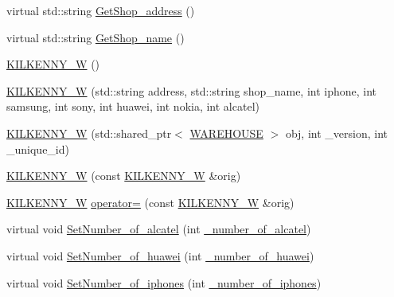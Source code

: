 \begin{DoxyCompactItemize}
\item 
virtual std\+::string \hyperlink{class_k_i_l_k_e_n_n_y___w_ad35a9d60fff2a3c1088f93ff04e6d9d4_ad35a9d60fff2a3c1088f93ff04e6d9d4}{Get\+Shop\+\_\+address} ()
\item 
virtual std\+::string \hyperlink{class_k_i_l_k_e_n_n_y___w_a93dac05f03edc97797f89501aa2af73a_a93dac05f03edc97797f89501aa2af73a}{Get\+Shop\+\_\+name} ()
\item 
\hyperlink{class_k_i_l_k_e_n_n_y___w_aee4c4b30bc934ff827f0851077b7fbab_aee4c4b30bc934ff827f0851077b7fbab}{K\+I\+L\+K\+E\+N\+N\+Y\+\_\+W} ()
\item 
\hyperlink{class_k_i_l_k_e_n_n_y___w_a292872c50225002759ebe70be3c96a72_a292872c50225002759ebe70be3c96a72}{K\+I\+L\+K\+E\+N\+N\+Y\+\_\+W} (std\+::string address, std\+::string shop\+\_\+name, int iphone, int samsung, int sony, int huawei, int nokia, int alcatel)
\item 
\hyperlink{class_k_i_l_k_e_n_n_y___w_a6df9a34ae732b0196391aceecf865089_a6df9a34ae732b0196391aceecf865089}{K\+I\+L\+K\+E\+N\+N\+Y\+\_\+W} (std\+::shared\+\_\+ptr$<$ \hyperlink{class_w_a_r_e_h_o_u_s_e}{W\+A\+R\+E\+H\+O\+U\+SE} $>$ obj, int \+\_\+version, int \+\_\+unique\+\_\+id)
\item 
\hyperlink{class_k_i_l_k_e_n_n_y___w_a370a1fb0d26d2b80da6e1101921d1564_a370a1fb0d26d2b80da6e1101921d1564}{K\+I\+L\+K\+E\+N\+N\+Y\+\_\+W} (const \hyperlink{class_k_i_l_k_e_n_n_y___w}{K\+I\+L\+K\+E\+N\+N\+Y\+\_\+W} \&orig)
\item 
\hyperlink{class_k_i_l_k_e_n_n_y___w}{K\+I\+L\+K\+E\+N\+N\+Y\+\_\+W} \hyperlink{class_k_i_l_k_e_n_n_y___w_acff3cfb6cc15b4c4bc0dbe5685406393_acff3cfb6cc15b4c4bc0dbe5685406393}{operator=} (const \hyperlink{class_k_i_l_k_e_n_n_y___w}{K\+I\+L\+K\+E\+N\+N\+Y\+\_\+W} \&orig)
\item 
virtual void \hyperlink{class_k_i_l_k_e_n_n_y___w_ac4c3dbc9e74a4ae6c0a7e88d7a8f80a2_ac4c3dbc9e74a4ae6c0a7e88d7a8f80a2}{Set\+Number\+\_\+of\+\_\+alcatel} (int \hyperlink{class_k_i_l_k_e_n_n_y___w_ab1523ca2daf22c518edb3be585485b16_ab1523ca2daf22c518edb3be585485b16}{\+\_\+number\+\_\+of\+\_\+alcatel})
\item 
virtual void \hyperlink{class_k_i_l_k_e_n_n_y___w_a2b89e05ada24ce0b7055f2b7cfb76e52_a2b89e05ada24ce0b7055f2b7cfb76e52}{Set\+Number\+\_\+of\+\_\+huawei} (int \hyperlink{class_k_i_l_k_e_n_n_y___w_a5aedbf8c3815df0d35a94ed9105f6574_a5aedbf8c3815df0d35a94ed9105f6574}{\+\_\+number\+\_\+of\+\_\+huawei})
\item 
virtual void \hyperlink{class_k_i_l_k_e_n_n_y___w_abdea4a1698ad841e4d758e6b3e3bef62_abdea4a1698ad841e4d758e6b3e3bef62}{Set\+Number\+\_\+of\+\_\+iphones} (int \hyperlink{class_k_i_l_k_e_n_n_y___w_a91935316f3da1d18589f7d02ec0ac24c_a91935316f3da1d18589f7d02ec0ac24c}{\+\_\+number\+\_\+of\+\_\+iphones})

\end{DoxyCompactItemize}
